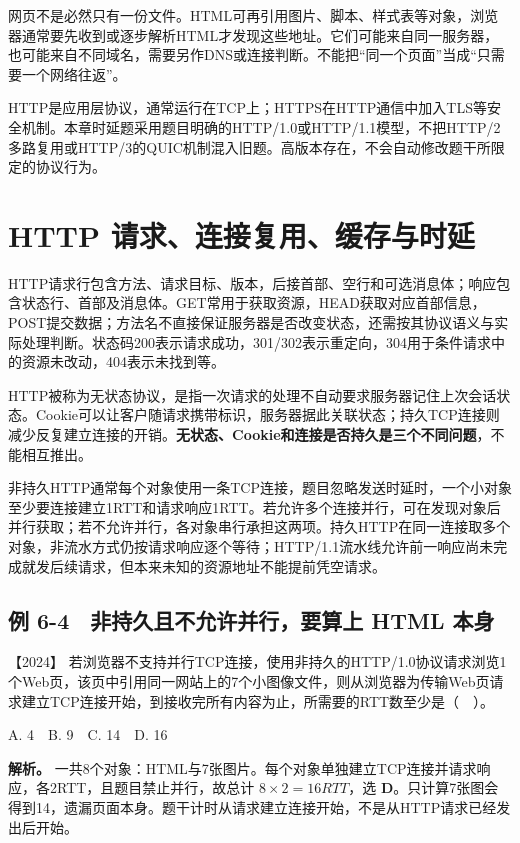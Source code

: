 网页不是必然只有一份文件。HTML可再引用图片、脚本、样式表等对象，浏览器通常要先收到或逐步解析HTML才发现这些地址。它们可能来自同一服务器，也可能来自不同域名，需要另作DNS或连接判断。不能把``同一个页面''当成``只需要一个网络往返''。

HTTP是应用层协议，通常运行在TCP上；HTTPS在HTTP通信中加入TLS等安全机制。本章时延题采用题目明确的HTTP/1.0或HTTP/1.1模型，不把HTTP/2多路复用或HTTP/3的QUIC机制混入旧题。高版本存在，不会自动修改题干所限定的协议行为。

\section{HTTP 请求、连接复用、缓存与时延}\label{cn-06-08}

HTTP请求行包含方法、请求目标、版本，后接首部、空行和可选消息体；响应包含状态行、首部及消息体。GET常用于获取资源，HEAD获取对应首部信息，POST提交数据；方法名不直接保证服务器是否改变状态，还需按其协议语义与实际处理判断。状态码200表示请求成功，301/302表示重定向，304用于条件请求中的资源未改动，404表示未找到等。

HTTP被称为无状态协议，是指一次请求的处理不自动要求服务器记住上次会话状态。Cookie可以让客户随请求携带标识，服务器据此关联状态；持久TCP连接则减少反复建立连接的开销。\textbf{无状态、Cookie和连接是否持久是三个不同问题}，不能相互推出。

非持久HTTP通常每个对象使用一条TCP连接，题目忽略发送时延时，一个小对象至少要连接建立1RTT和请求响应1RTT。若允许多个连接并行，可在发现对象后并行获取；若不允许并行，各对象串行承担这两项。持久HTTP在同一连接取多个对象，非流水方式仍按请求响应逐个等待；HTTP/1.1流水线允许前一响应尚未完成就发后续请求，但本来未知的资源地址不能提前凭空请求。

\subsection{例 6-4　非持久且不允许并行，要算上 HTML 本身}\label{cn-ex6-4}

\noindent{}【2024】 若浏览器不支持并行TCP连接，使用非持久的HTTP/1.0协议请求浏览1个Web页，该页中引用同一网站上的7个小图像文件，则从浏览器为传输Web页请求建立TCP连接开始，到接收完所有内容为止，所需要的RTT数至少是（　）。

A. 4　B. 9　C. 14　D. 16


\textbf{解析。} 一共8个对象：HTML与7张图片。每个对象单独建立TCP连接并请求响应，各2RTT，且题目禁止并行，故总计 \(8\times2=16RTT\)，选 \textbf{D}。只计算7张图会得到14，遗漏页面本身。题干计时从请求建立连接开始，不是从HTTP请求已经发出后开始。

